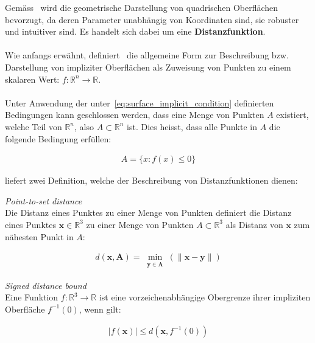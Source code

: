 Gemäss~\cite{hart_sphere_1994} wird die geometrische Darstellung von
quadrischen Oberflächen bevorzugt, da deren Parameter unabhängig von
Koordinaten sind, sie robuster und intuitiver sind. Es handelt sich dabei um
eine \textbf{Distanzfunktion}.\\
\\
Wie anfangs erwähnt, definiert~\cite{hart_sphere_1994} die allgemeine Form zur
Beschreibung bzw. Darstellung von impliziter Oberflächen als Zuweisung von
Punkten zu einem skalaren Wert: $ f : \mathbb{R}^{n} \to \mathbb{R} $.\\
\\
Unter Anwendung der unter~\ref{eq:surface_implicit_condition} definierten
Bedingungen kann geschlossen werden, dass eine Menge von Punkten $A$ existiert,
welche Teil von $\mathbb{R}^{n}$, also $A \subset \mathbb{R}^{n}$ ist. Dies heisst, dass alle Punkte in $A$ die folgende Bedingung erfüllen:

\begin{gather}
    A = \{ x : f(x) \leq 0 \}
\end{gather}

\cite{hart_sphere_1994} liefert zwei Definition, welche der Beschreibung von Distanzfunktionen dienen:

\theoremstyle{definition}
\begin{definition}{\label{theo:point_to_set_distance}
    \textit{Point-to-set distance}}\\
    Die Distanz eines Punktes zu einer Menge von Punkten definiert die Distanz
    eines Punktes $ \bm{x} \in \mathbb{R}^{3} $ zu einer Menge von Punkten $A
    \subset \mathbb{R}^{3}$ als Distanz von $\bm{x}$ zum nähesten Punkt in $A$:

    \begin{gather}
        d(\bm{x}, \bm{A}) = \min_{\substack{\bm{y} \in \bm{A}}}(\|\bm{x} - \bm{y}\|)
    \end{gather}
\end{definition}

\theoremstyle{definition}
\begin{definition}{\label{theo:signed_distnace_bound}
    \textit{Signed distance bound}}\\ 
    Eine Funktion $ f : \mathbb{R}^{3} \to \mathbb{R} $ ist eine
    vorzeichenabhängige Obergrenze ihrer impliziten Oberfläche $ f^{-1}(0)$,
    wenn gilt:

    \begin{gather}\label{eq:signed_distnace_bound}
        |f(\bm{x})| \leq d(\bm{x}, f^{-1}(0))
    \end{gather}
\end{definition}

